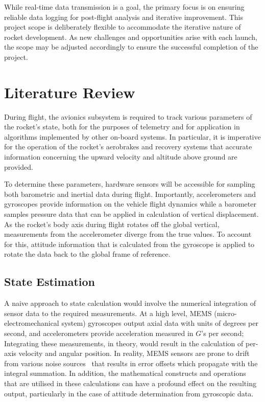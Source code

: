 While real-time data transmission is a goal, the primary focus is on ensuring reliable data logging for post-flight analysis and iterative improvement. This project scope is deliberately flexible to accommodate the iterative nature of rocket development. As new challenges and opportunities arise with each launch, the scope may be adjusted accordingly to ensure the successful completion of the project. 

\section{Literature Review}
During flight, the avionics subsystem is required to track various parameters of the rocket's state, both for the purposes of telemetry and for application in algorithms implemented by other on-board systems. In particular, it is imperative for the operation of the rocket's aerobrakes and recovery systems that accurate information concerning the upward velocity and altitude above ground are provided.

To determine these parameters, hardware sensors will be accessible for sampling both barometric and inertial data during flight. Importantly, accelerometers and gyroscopes provide information on the vehicle flight dynamics while a barometer samples pressure data that can be applied in calculation of vertical displacement. As the rocket's body axis during flight rotates off the global vertical, measurements from the accelerometer diverge from the true values. To account for this, attitude information that is calculated from the gyroscope is applied to rotate the data back to the global frame of reference.

\subsection{State Estimation}
A naive approach to state calculation would involve the numerical integration of sensor data to the required measurements. At a high level, MEMS (micro-electromechanical system) gyroscopes output axial data with units of degrees per second, and accelerometers provide acceleration measured in $\unit{G}$'s per second; Integrating these measurements, in theory, would result in the calculation of per-axis velocity and angular position. In reality, MEMS sensors are prone to drift from various noise sources~\cite{Diao2013, Pang2001} that results in error offsets which propagate with the integral summation. In addition, the mathematical constructs and operations that are utilised in these calculations can have a profound effect on the resulting output, particularly in the case of attitude determination from gyroscopic data.

